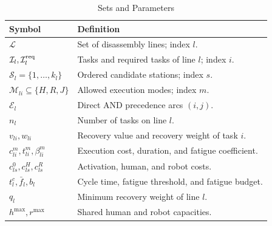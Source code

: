 \begin{table}[!t]
\caption{Sets and Parameters}\label{tab:notation}\centering\small
\begin{tabularx}{\columnwidth}{@{}lX@{}}\toprule
Symbol&Definition\\\midrule
$\mathcal L$&Set of disassembly lines; index $l$.\\
$\mathcal I_l,\mathcal I_l^{\rm req}$&Tasks and required tasks of line $l$; index $i$.\\
$\mathcal S_l=\{1,\ldots,k_l\}$&Ordered candidate stations; index $s$.\\
$\mathcal M_{li}\subseteq\{H,R,J\}$&Allowed execution modes; index $m$.\\
$\mathcal E_l$&Direct AND precedence arcs $(i,j)$.\\
$n_l$&Number of tasks on line $l$.\\
$v_{li},w_{li}$&Recovery value and recovery weight of task $i$.\\
$c_{li}^{m},t_{li}^{m},\beta_{li}^{m}$&Execution cost, duration, and fatigue coefficient.\\
$c_{ls}^{0},c_{ls}^{H},c_{ls}^{R}$&Activation, human, and robot costs.\\
$t_l^c,\bar f_l,b_l$&Cycle time, fatigue threshold, and fatigue budget.\\
$q_l$&Minimum recovery weight of line $l$.\\
$h^{\max},r^{\max}$&Shared human and robot capacities.\\
\bottomrule\end{tabularx}
\end{table}
